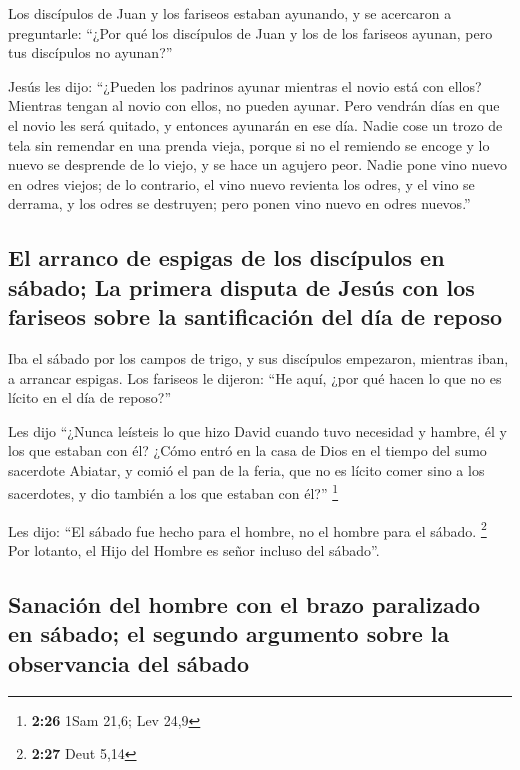  Los discípulos de Juan y los fariseos estaban ayunando,
y se acercaron a preguntarle: ``¿Por qué los discípulos de Juan y los de
los fariseos ayunan, pero tus discípulos no ayunan?''

 Jesús les dijo: ``¿Pueden los padrinos ayunar mientras
el novio está con ellos? Mientras tengan al novio con ellos, no pueden
ayunar.  Pero vendrán días en que el novio les será
quitado, y entonces ayunarán en ese día.  Nadie cose un
trozo de tela sin remendar en una prenda vieja, porque si no el remiendo
se encoge y lo nuevo se desprende de lo viejo, y se hace un agujero
peor.  Nadie pone vino nuevo en odres viejos; de lo
contrario, el vino nuevo revienta los odres, y el vino se derrama, y los
odres se destruyen; pero ponen vino nuevo en odres nuevos.''

\hypertarget{el-arranco-de-espigas-de-los-discuxedpulos-en-suxe1bado-la-primera-disputa-de-jesuxfas-con-los-fariseos-sobre-la-santificaciuxf3n-del-duxeda-de-reposo}{%
\subsection{El arranco de espigas de los discípulos en sábado; La
primera disputa de Jesús con los fariseos sobre la santificación del día
de
reposo}\label{el-arranco-de-espigas-de-los-discuxedpulos-en-suxe1bado-la-primera-disputa-de-jesuxfas-con-los-fariseos-sobre-la-santificaciuxf3n-del-duxeda-de-reposo}}

 Iba el sábado por los campos de trigo, y sus discípulos
empezaron, mientras iban, a arrancar espigas.  Los
fariseos le dijeron: ``He aquí, ¿por qué hacen lo que no es lícito en el
día de reposo?''

 Les dijo ``¿Nunca leísteis lo que hizo David cuando tuvo
necesidad y hambre, él y los que estaban con él?  ¿Cómo
entró en la casa de Dios en el tiempo del sumo sacerdote Abiatar, y
comió el pan de la feria, que no es lícito comer sino a los sacerdotes,
y dio también a los que estaban con él?'' \footnote{\textbf{2:26} 1Sam
  21,6; Lev 24,9}

 Les dijo: ``El sábado fue hecho para el hombre, no el
hombre para el sábado. \footnote{\textbf{2:27} Deut 5,14}
 Por lotanto, el Hijo del Hombre es señor incluso del
sábado''.

\hypertarget{sanaciuxf3n-del-hombre-con-el-brazo-paralizado-en-suxe1bado-el-segundo-argumento-sobre-la-observancia-del-suxe1bado}{%
\subsection{Sanación del hombre con el brazo paralizado en sábado; el
segundo argumento sobre la observancia del
sábado}\label{sanaciuxf3n-del-hombre-con-el-brazo-paralizado-en-suxe1bado-el-segundo-argumento-sobre-la-observancia-del-suxe1bado}}

